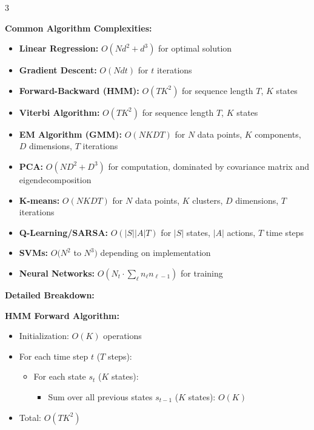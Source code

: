 \documentclass[10pt,landscape]{article}
\begin{document}
\begin{multicols}{3}
\begin{tcolorbox}[breakable, title=Time Complexity Analysis, colback=white, boxsep=1pt, left=1pt, right=1pt, top=1pt, bottom=1pt]
\textbf{Common Algorithm Complexities:}
\begin{itemize}[leftmargin=*,noitemsep,topsep=0pt]
    \item \textbf{Linear Regression:} $O(Nd^2 + d^3)$ for optimal solution
    \item \textbf{Gradient Descent:} $O(Ndt)$ for $t$ iterations
    \item \textbf{Forward-Backward (HMM):} $O(TK^2)$ for sequence length $T$, $K$ states
    \item \textbf{Viterbi Algorithm:} $O(TK^2)$ for sequence length $T$, $K$ states
    \item \textbf{EM Algorithm (GMM):} $O(NKDT)$ for $N$ data points, $K$ components, $D$ dimensions, $T$ iterations
    \item \textbf{PCA:} $O(ND^2 + D^3)$ for computation, dominated by covariance matrix and eigendecomposition
    \item \textbf{K-means:} $O(NKDT)$ for $N$ data points, $K$ clusters, $D$ dimensions, $T$ iterations
    \item \textbf{Q-Learning/SARSA:} $O(|S||A|T)$ for $|S|$ states, $|A|$ actions, $T$ time steps
    \item \textbf{SVMs:} $O(N^2$ to $N^3)$ depending on implementation
    \item \textbf{Neural Networks:} $O(N_t \cdot \sum_{\ell} n_{\ell} n_{\ell-1})$ for training
\end{itemize}

\textbf{Detailed Breakdown:}

\textbf{HMM Forward Algorithm:}
\begin{itemize}[leftmargin=*,noitemsep,topsep=0pt]
    \item Initialization: $O(K)$ operations
    \item For each time step $t$ ($T$ steps):
        \begin{itemize}[noitemsep]
            \item For each state $s_t$ ($K$ states):
                \begin{itemize}[noitemsep]
                    \item Sum over all previous states $s_{t-1}$ ($K$ states): $O(K)$
                \end{itemize}
        \end{itemize}
    \item Total: $O(TK^2)$
\end{itemize}


\end{tcolorbox}
\end{multicols}
\end{document}
